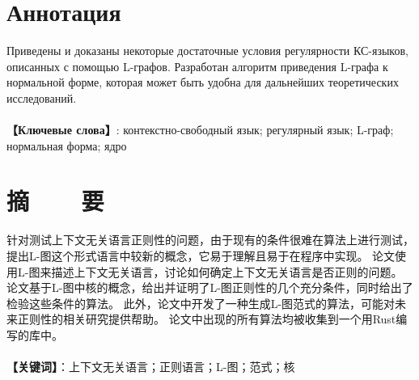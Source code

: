 \chapter*{Аннотация}

Приведены и доказаны некоторые достаточные условия регулярности КС-языков, описанных с помощью L-графов.
Разработан алгоритм приведения L-графа к нормальной форме, которая может быть удобна для дальнейших
теоретических исследований.
~ \\
~ \\
\textbf{【Ключевые слова】}: контекстно-свободный язык; регулярный язык; L-граф; нормальная форма; ядро
~ \\

\chapter*{摘~~~~要}

针对测试上下文无关语言正则性的问题，由于现有的条件很难在算法上进行测试，提出L-图这个形式语言中较新的概念，它易于理解且易于在程序中实现。
论文使用L-图来描述上下文无关语言，讨论如何确定上下文无关语言是否正则的问题。
论文基于L-图中核的概念，给出并证明了L-图正则性的几个充分条件，同时给出了检验这些条件的算法。
此外，论文中开发了一种生成L-图范式的算法，可能对未来正则性的相关研究提供帮助。
论文中出现的所有算法均被收集到一个用Rust编写的库中。
~ \\
~ \\
\textbf{【关键词】}：上下文无关语言；正则语言；L-图；范式；核

\pagebreak